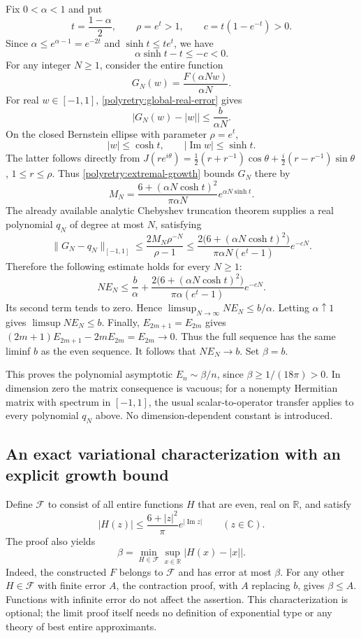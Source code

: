\documentclass[11pt]{article}
\newcommand{\R}{\mathbb R}
\newcommand{\C}{\mathbb C}
\theoremstyle{remark}
\numberwithin{equation}{section}
\begin{document}
Fix $0<\alpha<1$ and put
\[
 t=\frac{1-\alpha}{2},\qquad \rho=e^t>1,
 \qquad c=t(1-e^{-t})>0.
\]
Since $\alpha\le e^{\alpha-1}=e^{-2t}$ and
$\sinh t\le te^t$, we have
\begin{equation}\label{polyretry:strict-exponent}
 \alpha\sinh t-t\le -c<0.
\end{equation}
For any integer $N\ge1$, consider the entire function
\[
 G_N(w)=\frac{F(\alpha Nw)}{\alpha N}.
\]
For real $w\in[-1,1]$, \eqref{polyretry:global-real-error} gives
\[
 |G_N(w)-|w||\le\frac{b}{\alpha N}.
\]
On the closed Bernstein ellipse with parameter $\rho=e^t$,
\[
 |w|\le\cosh t,\qquad
 |\operatorname{Im}w|\le\sinh t.
\]
The latter follows directly from
$J(re^{i\theta})=\tfrac12(r+r^{-1})\cos\theta+
\tfrac i2(r-r^{-1})\sin\theta$, $1\le r\le\rho$.
Thus \eqref{polyretry:extremal-growth} bounds $G_N$ there by
\[
 M_N=\frac{6+(\alpha N\cosh t)^2}{\pi\alpha N}
       e^{\alpha N\sinh t}.
\]
The already available analytic Chebyshev truncation theorem supplies a
real polynomial $q_N$ of degree at most $N$, satisfying
\[
 \|G_N-q_N\|_{[-1,1]}
 \le\frac{2M_N\rho^{-N}}{\rho-1}
 \le\frac{2\bigl(6+(\alpha N\cosh t)^2\bigr)}
          {\pi\alpha N(e^t-1)}e^{-cN}.
\]
Therefore the following estimate holds for every $N\ge1$:
\begin{equation}\label{polyretry:liminf-to-limsup}
 NE_N\le\frac b\alpha+
 \frac{2\bigl(6+(\alpha N\cosh t)^2\bigr)}
      {\pi\alpha(e^t-1)}e^{-cN}.
\end{equation}
Its second term tends to zero.  Hence
$\limsup_{N\to\infty}NE_N\le b/\alpha$.
Letting $\alpha\uparrow1$ gives $\limsup NE_N\le b$.
Finally, $E_{2m+1}=E_{2m}$ gives
$(2m+1)E_{2m+1}-2mE_{2m}=E_{2m}\to0$.
Thus the full sequence has the same liminf $b$ as the even sequence.
It follows that $NE_N\to b$.  Set $\beta=b$.

This proves the polynomial asymptotic $E_n\sim\beta/n$, since
$\beta\ge1/(18\pi)>0$.  In dimension zero the matrix consequence is
vacuous; for a nonempty Hermitian matrix with spectrum in $[-1,1]$,
the usual scalar-to-operator transfer applies to every polynomial
$q_N$ above.  No dimension-dependent constant is introduced.

\subsection{An exact variational characterization with an explicit growth bound}
Define $\mathcal F$ to consist of all entire functions $H$ that are
even, real on $\R$, and satisfy
\[
 |H(z)|\le\frac{6+|z|^2}{\pi}e^{|\operatorname{Im}z|}
 \qquad(z\in\C).
\]
The proof also yields
\begin{equation}\label{polyretry:bernstein-variational}
 \beta=\min_{H\in\mathcal F}\sup_{x\in\R}|H(x)-|x||.
\end{equation}
Indeed, the constructed $F$ belongs to $\mathcal F$ and has error at
most $\beta$.  For any other $H\in\mathcal F$ with finite error $A$,
the contraction proof, with $A$ replacing $b$, gives $\beta\le A$.
Functions with infinite error do not affect the assertion.  This
characterization is optional; the limit proof itself needs no
definition of exponential type or any theory of best entire
approximants.
\end{document}
